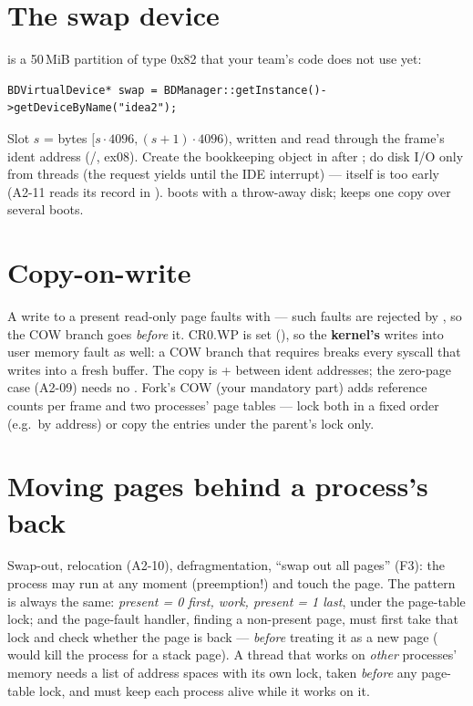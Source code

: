 \section{The swap device}

 is a 50\,MiB partition of type 0x82 that your team's code does not use yet:
\begin{lstlisting}[style=cpp]
BDVirtualDevice* swap = BDManager::getInstance()->getDeviceByName("idea2");
\end{lstlisting} Slot $s$ = bytes
$[s \cdot 4096, (s+1) \cdot 4096)$, written and read through the frame's ident address
(/, ex08). Create the bookkeeping object in  after
; do disk I/O only from threads (the request yields until the
IDE interrupt) ---  itself is too early (A2-11 reads its record in
).  boots with a throw-away disk; 
keeps one copy over several boots.

\section{Copy-on-write}

A write to a present read-only page faults with  --- such faults are
rejected by , so the COW branch goes \emph{before} it. CR0.WP is set
(), so the \textbf{kernel's} writes into user memory fault as well: a COW branch that
requires  breaks every syscall that writes into a fresh buffer. The copy is
 +  between ident addresses; the zero-page case (A2-09) needs no
. Fork's COW (your mandatory part) adds reference counts per frame and two processes'
page tables --- lock both in a fixed order (e.g.\ by address) or copy the entries under the parent's
lock only.

\section{Moving pages behind a process's back}

Swap-out, relocation (A2-10), defragmentation, ``swap out all pages'' (F3): the process may run at any
moment (preemption!) and touch the page. The pattern is always the same: \emph{present = 0 first,
work, present = 1 last}, under the page-table lock; and the page-fault handler, finding a non-present
page, must first take that lock and check whether the page is back --- \emph{before} treating it as a
new page ( would kill the process for a stack page). A thread that works on
\emph{other} processes' memory needs a list of address spaces with its own lock, taken
\emph{before} any page-table lock, and must keep each process alive while it works on it.

